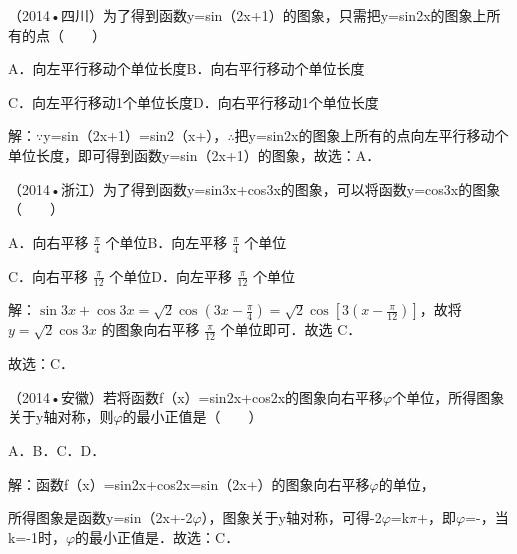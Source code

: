 \begin{question}
（2014•四川）为了得到函数y=sin（2x+1）的图象，只需把y=sin2x的图象上所有的点（　　）\par
A．向左平行移动个单位长度\qquad{}B．向右平行移动个单位长度\par
C．向左平行移动1个单位长度\qquad{}D．向右平行移动1个单位长度\par
\begin{solution}
解：\ensuremath{\because}y=sin（2x+1）=sin2（x+），\ensuremath{\therefore}把y=sin2x的图象上所有的点向左平行移动个单位长度，即可得到函数y=sin（2x+1）的图象，故选：A．\par
\end{solution}
\end{question}

\begin{question}
（2014•浙江）为了得到函数y=sin3x+cos3x的图象，可以将函数y=cos3x的图象（　　）\par
A．向右平移 $\frac{\pi}{4}$ 个单位\qquad B．向左平移 $\frac{\pi}{4}$ 个单位\par
C．向右平移 $\frac{\pi}{12}$ 个单位\qquad D．向左平移 $\frac{\pi}{12}$ 个单位\par
\begin{solution}
解：$\sin 3x+\cos 3x=\sqrt2\cos(3x-\frac{\pi}{4})=\sqrt2\cos[3(x-\frac{\pi}{12})]$，故将 $y=\sqrt2\cos 3x$ 的图象向右平移 $\frac{\pi}{12}$ 个单位即可．故选 C．\par
故选：C．\par
\end{solution}
\end{question}

\begin{question}
（2014•安徽）若将函数f（x）=sin2x+cos2x的图象向右平移\ensuremath{\varphi}个单位，所得图象关于y轴对称，则\ensuremath{\varphi}的最小正值是（　　）\par
A．\qquad{}B．\qquad{}C．\qquad{}D．\par
\begin{solution}
解：函数f（x）=sin2x+cos2x=sin（2x+）的图象向右平移\ensuremath{\varphi}的单位，\par
所得图象是函数y=sin（2x+-2\ensuremath{\varphi}），图象关于y轴对称，可得-2\ensuremath{\varphi}=k\ensuremath{\pi}+，即\ensuremath{\varphi}=-，当k=-1时，\ensuremath{\varphi}的最小正值是．故选：C．\par
\end{solution}
\end{question}

